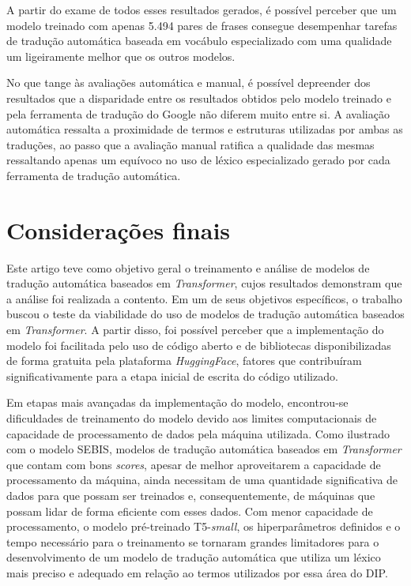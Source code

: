 \documentclass[portuguese]{textolivre}
\begin{document}
A partir do exame de todos esses resultados gerados, é possível perceber que um modelo treinado com apenas 5.494 pares de frases consegue desempenhar tarefas de tradução automática baseada em vocábulo especializado com uma qualidade um ligeiramente melhor que os outros modelos. 
 
No que tange às avaliações automática e manual, é possível depreender dos resultados que a disparidade entre os resultados obtidos pelo modelo treinado e pela ferramenta de tradução do Google não diferem muito entre si. A avaliação automática ressalta a proximidade de termos e estruturas utilizadas por ambas as traduções, ao passo que a avaliação manual ratifica a qualidade das mesmas ressaltando apenas um equívoco no uso de léxico especializado gerado por cada ferramenta de tradução automática.

\section{Considerações finais}\label{sec-organizacao}
Este artigo teve como objetivo geral o treinamento e análise de modelos de tradução automática baseados em \textit{Transformer}, cujos resultados demonstram que a análise foi realizada a contento. Em um de seus objetivos específicos, o trabalho buscou o teste da viabilidade do uso de modelos de tradução automática baseados em \textit{Transformer}. A partir disso, foi possível perceber que a implementação do modelo foi facilitada pelo uso de código aberto e de bibliotecas disponibilizadas de forma gratuita pela plataforma \textit{HuggingFace}, fatores que contribuíram significativamente para a etapa inicial de escrita do código utilizado.

Em etapas mais avançadas da implementação do modelo, encontrou-se dificuldades de treinamento do modelo devido aos limites computacionais de capacidade de processamento de dados pela máquina utilizada. Como ilustrado com o modelo SEBIS, modelos de tradução automática baseados em \textit{Transformer} que contam com bons \textit{scores}, apesar de melhor aproveitarem a capacidade de processamento da máquina, ainda necessitam de uma quantidade significativa de dados para que possam ser treinados e, consequentemente, de máquinas que possam lidar de forma eficiente com esses dados. Com menor capacidade de processamento, o modelo pré-treinado T5-\textit{small}, os hiperparâmetros definidos e o tempo necessário para o treinamento se tornaram grandes limitadores para o desenvolvimento de um modelo de tradução automática que utiliza um léxico mais preciso e adequado em relação ao termos utilizados por essa área do DIP.
\end{document}

